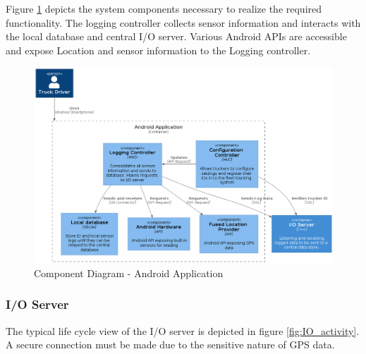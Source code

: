Figure \ref{fig:android_component} depicts the system components necessary to realize the required functionality.
The logging controller collects sensor information and interacts with the local database and central I/O server.
Various Android APIs are accessible and expose Location and sensor information to the Logging controller.
\begin{figure}[H]
\centering
\includegraphics[width=6in]{android_component.png}
\caption{Component Diagram - Android Application}
\label{fig:android_component}
\end{figure}

\subsubsection{I/O Server}
The typical life cycle view of the I/O server is depicted in figure \ref{fig:IO_activity}.
A secure connection must be made due to the sensitive nature of GPS data.

